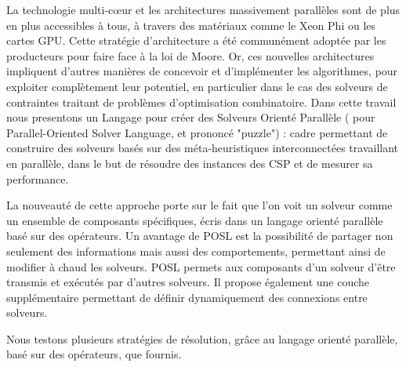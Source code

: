 La technologie multi-cœur et les architectures massivement parallèles sont de plus en plus accessibles à tous, à travers des matériaux comme le Xeon Phi ou les cartes GPU. Cette stratégie d'architecture a été communément adoptée par les producteurs pour faire face à la loi de Moore. Or, ces nouvelles architectures impliquent d'autres manières de concevoir et d'implémenter les algorithmes, pour exploiter complètement leur potentiel, en particulier dans le cas des solveurs de contraintes traitant de problèmes d'optimisation combinatoire. Dans cette travail nous presentons un Langage pour créer des Solveurs Orienté Parallèle (\posl{} pour Parallel-Oriented Solver Language, et prononcé "puzzle") : cadre permettant de construire des solveurs basés sur des méta-heuristiques interconnectées travaillant en parallèle, dans le but de résoudre des instances des CSP et de mesurer sa performance. 

La nouveauté de cette approche porte sur le fait que l'on voit un solveur comme un ensemble de composants spécifiques, écris dans un langage orienté parallèle basé sur des opérateurs. Un avantage de POSL est la possibilité de partager non seulement des informations mais aussi des comportements, permettant ainsi de modifier à chaud les solveurs. POSL permets aux composants d'un solveur d'être transmis et exécutés par d'autres solveurs. Il propose également une couche supplémentaire permettant de définir dynamiquement des connexions entre solveurs.

Nous testons plusieurs stratégies de résolution, grâce au langage orienté parallèle, basé sur des opérateurs, que \posl{} fournis.